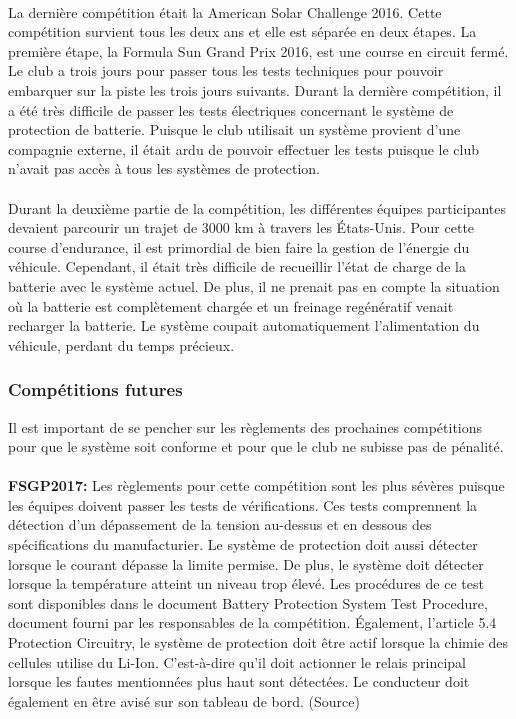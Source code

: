 		\paragraph{}
		La dernière compétition était la American Solar Challenge 2016. Cette compétition survient tous les deux ans et elle est séparée en deux étapes. La première étape, la Formula Sun Grand Prix 2016, est une course en circuit fermé. Le club a trois jours pour passer tous les tests techniques pour pouvoir embarquer sur la piste les trois jours suivants. Durant la dernière compétition, il a été très difficile de passer les tests électriques concernant le système de protection de batterie. Puisque le club utilisait un système provient d'une compagnie externe, il était ardu de pouvoir effectuer les tests puisque le club n'avait pas accès à tous les systèmes de protection.
		
		\paragraph{}
		Durant la deuxième partie de la compétition, les différentes équipes participantes devaient parcourir un trajet de 3000 km à travers les États-Unis. Pour cette course d'endurance, il est primordial de bien faire la gestion de l'énergie du véhicule. Cependant, il était très difficile de recueillir l'état de charge de la batterie avec le système actuel. De plus, il ne prenait pas en compte la situation où la batterie est complètement chargée et un freinage regénératif venait recharger la batterie. Le système coupait automatiquement l'alimentation du véhicule, perdant du temps précieux.
		
		\subsubsection{Compétitions futures}
		Il est important de se pencher sur les règlements des prochaines compétitions pour que le système soit conforme et pour que le club ne subisse pas de pénalité.
		
		\paragraph{}
		\textbf{FSGP2017:} Les règlements pour cette compétition sont les plus sévères puisque les équipes doivent passer les tests de vérifications. Ces tests comprennent la détection d'un dépassement de la tension au-dessus et en dessous des spécifications du manufacturier. Le système de protection doit aussi détecter lorsque le courant dépasse la limite permise. De plus, le système doit détecter lorsque la température atteint un niveau trop élevé. Les procédures de ce test sont disponibles dans le document Battery Protection System Test Procedure, document fourni par les responsables de la compétition. Également, l'article 5.4 Protection Circuitry, le système de protection doit être actif lorsque la chimie des cellules utilise du Li-Ion. C'est-à-dire qu'il doit actionner le relais principal lorsque les fautes mentionnées plus haut sont détectées. Le conducteur doit également en être avisé sur son tableau de bord. (Source)
		
